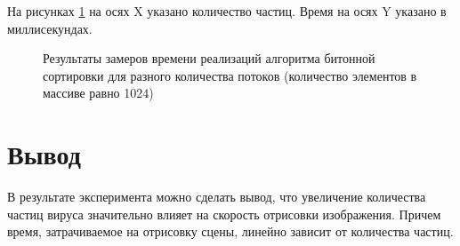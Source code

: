 На рисунках \ref{fig:timings} на осях X указано количество частиц. Время на осях Y указано в миллисекундах.

\begin{figure}[ph!]
	\caption{Результаты замеров времени реализаций алгоритма битонной сортировки для разного количества потоков (количество элементов в массиве равно 1024)}
	\label{fig:timings}
\end{figure}


\section*{Вывод}

В результате эксперимента можно сделать вывод, что увеличение количества частиц вируса значительно влияет на скорость отрисовки изображения. Причем время, затрачиваемое на отрисовку сцены, линейно зависит от количества частиц.


